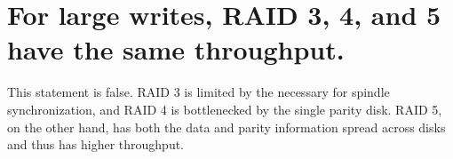 \documentclass[a4paper,11pt]{article}
\begin{document}

\section{For large writes, RAID 3, 4, and 5 have the same throughput.}
This statement is false.  RAID 3 is limited by the necessary for spindle synchronization, and RAID 4 is bottlenecked by the single parity disk.  RAID 5, on the other hand, has both the data and parity information spread across disks and thus has higher throughput.  

\end{document}
